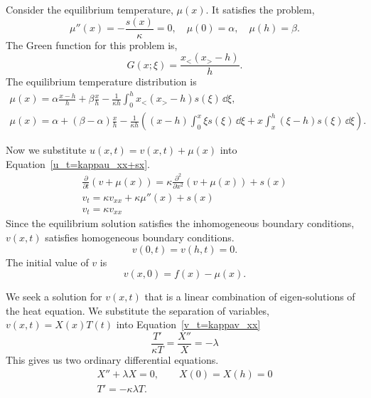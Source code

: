 Consider the equilibrium temperature, $\mu(x)$.  It satisfies the problem,
\[ 
\mu''(x) = - \frac{s(x)}{\kappa} = 0, \quad 
\mu(0) = \alpha, \quad \mu(h) = \beta. 
\]
The Green function for this problem is,
\[
G(x;\xi) = \frac{x_< (x_>-h)}{h}.
\]
The equilibrium temperature distribution is
\begin{gather*}
  \mu(x) = \alpha \frac{x-h}{h} + \beta \frac{x}{h} 
  - \frac{1}{\kappa h} \int_0^h x_< (x_>-h) s(\xi) \,\dd \xi, \\
  \boxed{
    \mu(x) = \alpha + (\beta - \alpha) \frac{x}{h} 
    - \frac{1}{\kappa h} \left( (x-h) \int_0^x \xi s(\xi) \,\dd \xi
      + x \int_x^h (\xi-h) s(\xi) \,\dd \xi \right).
    }
\end{gather*}


Now we substitute $u(x,t) = v(x,t) + \mu(x)$ into
Equation~\ref{u_t=kappau_xx+sx}.
\begin{gather}
  \nonumber
  \frac{\partial}{\partial t} ( v + \mu(x) ) = \kappa  \frac{\partial^2}{\partial x^2} (v + \mu(x)) + s(x) \\
  \nonumber
  v_t = \kappa v_{xx} + \kappa \mu''(x) + s(x) \\
  \label{v_t=kappav_xx}
  v_t = \kappa v_{xx}
\end{gather}
Since the equilibrium solution satisfies the inhomogeneous boundary 
conditions, $v(x,t)$ satisfies homogeneous boundary 
conditions.
\[ 
v(0,t) = v(h,t) = 0. 
\]
The initial value of $v$ is
\[ 
v(x,0) = f(x) - \mu(x).
\]

We seek a solution for $v(x,t)$
that is a linear combination of eigen-solutions of the heat equation.
We substitute the separation of variables, $v(x,t) = X(x)T(t)$
into Equation~\ref{v_t=kappav_xx}
\[ 
\frac{T'}{\kappa T} = \frac{X''}{X} = -\lambda
\]
This gives us two ordinary differential equations.
\begin{gather*}
  X'' + \lambda X = 0, \qquad X(0) = X(h) = 0 \\
  T' = -\kappa \lambda T.
\end{gather*}

